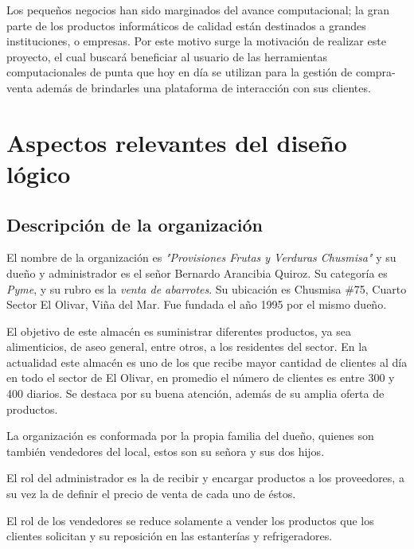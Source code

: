 \documentclass[letterpaper,12pt]{article}
\begin{document}
Los pequeños negocios han sido marginados del avance computacional; la gran parte de los productos informáticos de 
calidad están destinados a grandes instituciones, o empresas. Por este motivo surge la motivación de realizar este proyecto, el cual 
buscará beneficiar al usuario de las herramientas computacionales de punta que hoy en día se utilizan para la gestión de compra-venta
además de brindarles una plataforma de interacción con sus clientes.



\setcounter{secnumdepth}{3}


\section{Aspectos relevantes del diseño lógico}

\subsection{Descripción de la organización}

El nombre de la organización es \emph{"Provisiones Frutas y Verduras Chusmisa"} y su dueño y administrador es el señor 
Bernardo Arancibia Quiroz. Su categoría es \emph{Pyme}, y su rubro es la \emph{venta de abarrotes}.
Su ubicación es Chusmisa \#75, Cuarto Sector El Olivar, Viña del Mar. Fue fundada el año 1995 por el mismo dueño.

El objetivo de este almacén es suministrar diferentes productos, ya sea alimenticios, de aseo general, entre otros, a los 
residentes del sector.  En la actualidad este almacén es uno de los que recibe mayor cantidad de clientes al día 
en todo el sector de El Olivar, en promedio el número de clientes es entre 300 y 400 diarios. Se destaca por su buena 
atención, además de su amplia oferta de productos.

La organización es conformada por la propia familia del dueño, quienes son también vendedores del local, estos son su 
señora y sus dos hijos.

El rol del administrador es la de recibir y encargar productos a los proveedores, a su vez la de definir el precio de 
venta de cada uno de éstos.

El rol de los vendedores se reduce solamente a vender los productos que los clientes solicitan y su reposición en las 
estanterías y refrigeradores.
\end{document}
